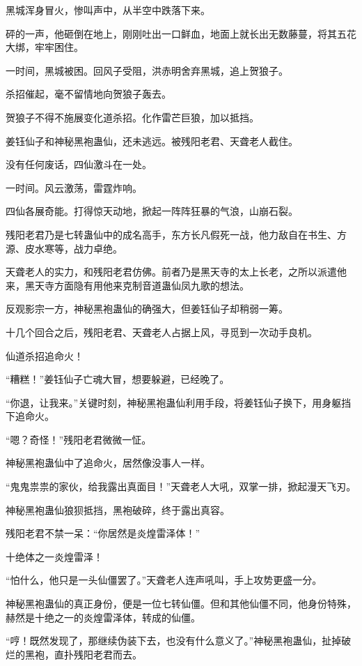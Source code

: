 \begin{this_body}
黑城浑身冒火，惨叫声中，从半空中跌落下来。

砰的一声，他砸倒在地上，刚刚吐出一口鲜血，地面上就长出无数藤蔓，将其五花大绑，牢牢困住。

一时间，黑城被困。回风子受阻，洪赤明舍弃黑城，追上贺狼子。

杀招催起，毫不留情地向贺狼子轰去。

贺狼子不得不施展变化道杀招。化作雷芒巨狼，加以抵挡。

姜钰仙子和神秘黑袍蛊仙，还未逃远。被残阳老君、天聋老人截住。

没有任何废话，四仙激斗在一处。

一时间。风云激荡，雷霆炸响。

四仙各展奇能。打得惊天动地，掀起一阵阵狂暴的气浪，山崩石裂。

残阳老君乃是七转蛊仙中的成名高手，东方长凡假死一战，他力敌自在书生、方源、皮水寒等，战力卓绝。

天聋老人的实力，和残阳老君仿佛。前者乃是黑天寺的太上长老，之所以派遣他来，黑天寺方面隐有用他来克制音道蛊仙凤九歌的想法。

反观影宗一方，神秘黑袍蛊仙的确强大，但姜钰仙子却稍弱一筹。

十几个回合之后，残阳老君、天聋老人占据上风，寻觅到一次动手良机。

仙道杀招追命火！

“糟糕！”姜钰仙子亡魂大冒，想要躲避，已经晚了。

“你退，让我来。”关键时刻，神秘黑袍蛊仙利用手段，将姜钰仙子换下，用身躯挡下追命火。

“嗯？奇怪！”残阳老君微微一怔。

神秘黑袍蛊仙中了追命火，居然像没事人一样。

“鬼鬼祟祟的家伙，给我露出真面目！”天聋老人大吼，双掌一排，掀起漫天飞刃。

神秘黑袍蛊仙狼狈抵挡，黑袍破碎，终于露出真容。

残阳老君不禁一呆：“你居然是炎煌雷泽体！”

十绝体之一炎煌雷泽！

“怕什么，他只是一头仙僵罢了。”天聋老人连声吼叫，手上攻势更盛一分。

神秘黑袍蛊仙的真正身份，便是一位七转仙僵。但和其他仙僵不同，他身份特殊，赫然是十绝之一的炎煌雷泽体，转成的仙僵。

“哼！既然发现了，那继续伪装下去，也没有什么意义了。”神秘黑袍蛊仙，扯掉破烂的黑袍，直扑残阳老君而去。


\end{this_body}
